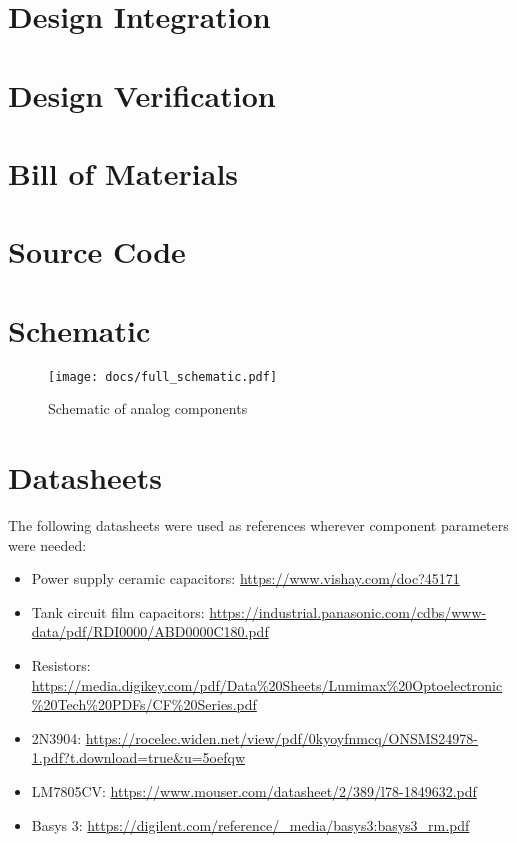 \documentclass[12pt]{article}
\numberwithin{figure}{section}
\numberwithin{equation}{section}
\begin{document}
\section{Design Integration} 

\section{Design Verification} 


\section{Bill of Materials}

\section{Source Code}
\section{Schematic} 
\begin{figure}[H] 
    \centering 
    \texttt{[image: docs/full\_schematic.pdf]}
    \caption{Schematic of analog components} 
    \label{schematic}
\end{figure}

\section{Datasheets}
The following datasheets were used as references wherever component parameters were needed: 

\begin{itemize} 
    \item Power supply ceramic capacitors: \url{https://www.vishay.com/doc?45171} 
    \item Tank circuit film capacitors: \url{https://industrial.panasonic.com/cdbs/www-data/pdf/RDI0000/ABD0000C180.pdf}
    \item Resistors: \url{https://media.digikey.com/pdf/Data%20Sheets/Lumimax%20Optoelectronic%20Tech%20PDFs/CF%20Series.pdf}
    \item 2N3904: \url{https://rocelec.widen.net/view/pdf/0kyoyfnmcq/ONSMS24978-1.pdf?t.download=true&u=5oefqw} 
    \item LM7805CV: \url{https://www.mouser.com/datasheet/2/389/l78-1849632.pdf}
    \item Basys 3: \url{https://digilent.com/reference/_media/basys3:basys3_rm.pdf}
\end{itemize}
\end{document}
